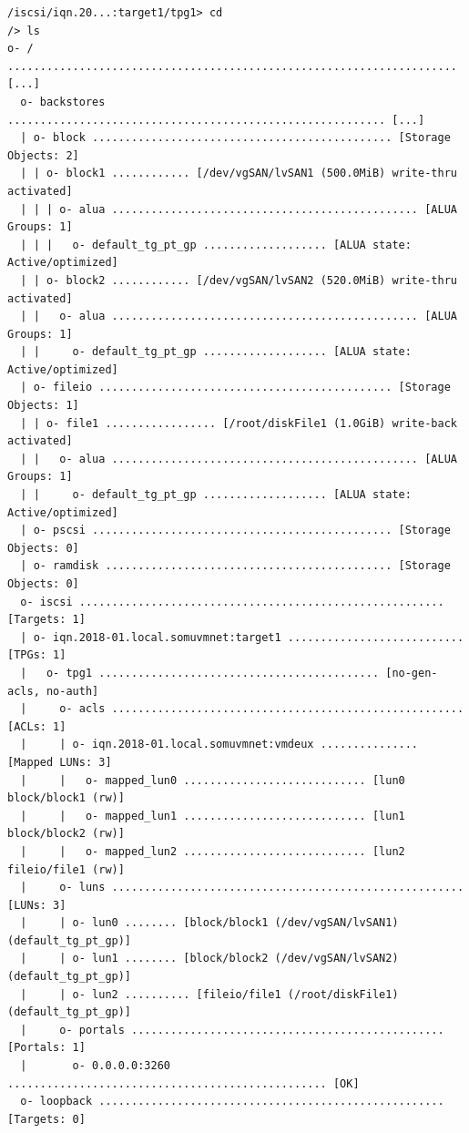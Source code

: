 \vspace{-15pt}
\begin{verbatim}
/iscsi/iqn.20...:target1/tpg1> cd
/> ls
o- / ..................................................................... [...]
  o- backstores .......................................................... [...]
  | o- block .............................................. [Storage Objects: 2]
  | | o- block1 ............ [/dev/vgSAN/lvSAN1 (500.0MiB) write-thru activated]
  | | | o- alua ............................................... [ALUA Groups: 1]
  | | |   o- default_tg_pt_gp ................... [ALUA state: Active/optimized]
  | | o- block2 ............ [/dev/vgSAN/lvSAN2 (520.0MiB) write-thru activated]
  | |   o- alua ............................................... [ALUA Groups: 1]
  | |     o- default_tg_pt_gp ................... [ALUA state: Active/optimized]
  | o- fileio ............................................. [Storage Objects: 1]
  | | o- file1 ................. [/root/diskFile1 (1.0GiB) write-back activated]
  | |   o- alua ............................................... [ALUA Groups: 1]
  | |     o- default_tg_pt_gp ................... [ALUA state: Active/optimized]
  | o- pscsi .............................................. [Storage Objects: 0]
  | o- ramdisk ............................................ [Storage Objects: 0]
  o- iscsi ........................................................ [Targets: 1]
  | o- iqn.2018-01.local.somuvmnet:target1 ........................... [TPGs: 1]
  |   o- tpg1 ........................................... [no-gen-acls, no-auth]
  |     o- acls ...................................................... [ACLs: 1]
  |     | o- iqn.2018-01.local.somuvmnet:vmdeux ............... [Mapped LUNs: 3]
  |     |   o- mapped_lun0 ............................ [lun0 block/block1 (rw)]
  |     |   o- mapped_lun1 ............................ [lun1 block/block2 (rw)]
  |     |   o- mapped_lun2 ............................ [lun2 fileio/file1 (rw)]
  |     o- luns ...................................................... [LUNs: 3]
  |     | o- lun0 ........ [block/block1 (/dev/vgSAN/lvSAN1) (default_tg_pt_gp)]
  |     | o- lun1 ........ [block/block2 (/dev/vgSAN/lvSAN2) (default_tg_pt_gp)]
  |     | o- lun2 .......... [fileio/file1 (/root/diskFile1) (default_tg_pt_gp)]
  |     o- portals ................................................ [Portals: 1]
  |       o- 0.0.0.0:3260 ................................................. [OK]
  o- loopback ..................................................... [Targets: 0]
\end{verbatim}
\vspace{-10pt}


